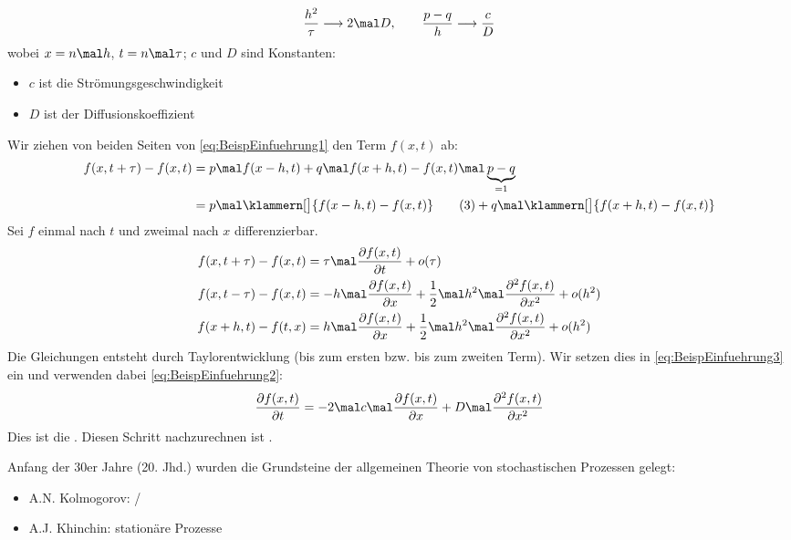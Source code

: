 \begin{beisp}
\begin{align}
		\frac{h^2}{\tau}\longrightarrow 2\mal D,\qquad
		\frac{p-q}{h}\longrightarrow\frac{c}{D}
	\end{align}
	wobei $x=n\mal h$, $t=n\mal\tau$; $c$ und $D$ sind Konstanten:
	\begin{itemize}
		\item $c$ ist die Strömungsgeschwindigkeit
		\item $D$ ist der Diffusionskoeffizient
	\end{itemize}
	Wir ziehen von beiden Seiten von \eqref{eq:BeispEinfuehrung1} den Term $f(x,t)$ ab:
	\begin{align}
			f(x,t+\tau)-f(x,t)\nonumber
			&=p\mal f(x-h,t)+q\mal f(x+h,t)-f(x,t)\mal\underbrace{p-q}_{=1}\\
			&=p\mal\klammern[\big]{f(x-h,t)-f(x,t)}\label{eq:BeispEinfuehrung3}\tag{3}
			+q\mal\klammern[\big]{f(x+h,t)-f(x,t)}
	\end{align}
	Sei $f$ einmal nach $t$ und zweimal nach $x$ differenzierbar.
	\begin{align*}
		f(x,t+\tau)-f(x,t)
		&=\tau\mal\frac{\partial f(x,t)}{\partial t}+o(\tau)\\
		f(x,t-\tau)-f(x,t)
		&=-h\mal\frac{\partial f(x,t)}{\partial x}
		+\frac{1}{2}\mal h^2\mal\frac{\partial^2 f(x,t)}{\partial x^2}+o(h^2)\\
		f(x+h,t)-f(t,x)
		&=h\mal\frac{\partial f(x,t)}{\partial x}+\frac{1}{2}\mal h^2\mal\frac{\partial^2 f(x,t)}{\partial x^2}+o(h^2)
	\end{align*}
	Die Gleichungen entsteht durch Taylorentwicklung (bis zum ersten bzw. bis zum zweiten Term).
	Wir setzen dies in \eqref{eq:BeispEinfuehrung3} ein und verwenden dabei \eqref{eq:BeispEinfuehrung2}:
	\begin{align*}
		\frac{\partial f(x,t)}{\partial t}
		=-2\mal c\mal\frac{\partial f(x,t)}{\partial x}+D\mal\frac{\partial^2 f(x,t)}{\partial x^2}
	\end{align*}
	Dies ist die .
	Diesen Schritt nachzurechnen ist .
\end{beisp}

Anfang der 30er Jahre (20. Jhd.) wurden die 
Grundsteine der allgemeinen Theorie von stochastischen Prozessen gelegt:
\begin{itemize}
	\item A.N. Kolmogorov:  / 
	\item A.J. Khinchin: stationäre Prozesse 
\end{itemize}

